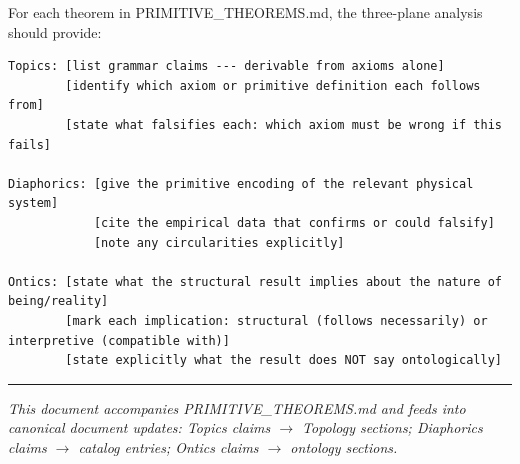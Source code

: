 \documentclass[11pt,a4paper]{article}
\begin{document}
For each theorem in PRIMITIVE\_THEOREMS.md, the three-plane analysis should provide:

\begin{lstlisting}
Topics: [list grammar claims --- derivable from axioms alone]
        [identify which axiom or primitive definition each follows from]
        [state what falsifies each: which axiom must be wrong if this fails]

Diaphorics: [give the primitive encoding of the relevant physical system]
            [cite the empirical data that confirms or could falsify]
            [note any circularities explicitly]

Ontics: [state what the structural result implies about the nature of being/reality]
        [mark each implication: structural (follows necessarily) or interpretive (compatible with)]
        [state explicitly what the result does NOT say ontologically]
\end{lstlisting}

\begin{center}
\rule{0.5\textwidth}{0.4pt}
\end{center}

\emph{This document accompanies PRIMITIVE\_THEOREMS.md and feeds into canonical document updates: Topics claims $\rightarrow$ Topology sections; Diaphorics claims $\rightarrow$ catalog entries; Ontics claims $\rightarrow$ ontology sections.}
\end{document}
